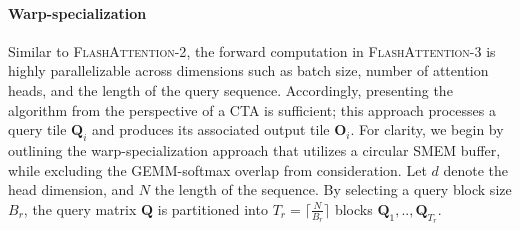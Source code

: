 \paragraph{Warp-specialization}
Similar to \textsc{FlashAttention-2}, the forward computation in \textsc{FlashAttention-3} is highly parallelizable across dimensions such as batch size, number of attention heads, and the length of the query sequence. Accordingly, presenting the algorithm from the perspective of a CTA is sufficient; this approach processes a query tile $\mathbf{Q}_i$ and produces its associated output tile $\mathbf{O}_i$. For clarity, we begin by outlining the warp-specialization approach that utilizes a circular SMEM buffer, while excluding the GEMM-softmax overlap from consideration. Let $d$ denote the head dimension, and $N$ the length of the sequence. By selecting a query block size $B_r$, the query matrix $\mathbf{Q}$ is partitioned into $T_r = \lceil \frac{N}{B_r} \rceil$ blocks $\mathbf{Q}_1, .., \mathbf{Q}_{T_r}$.

